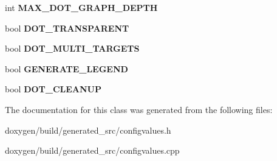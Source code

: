 \begin{DoxyCompactItemize}
int {\bfseries M\+A\+X\+\_\+\+D\+O\+T\+\_\+\+G\+R\+A\+P\+H\+\_\+\+D\+E\+P\+TH}
\item 
\mbox{\label{class_config_values_a126973fc62e20cead715f2f5dd740ddc}} 
bool {\bfseries D\+O\+T\+\_\+\+T\+R\+A\+N\+S\+P\+A\+R\+E\+NT}
\item 
\mbox{\label{class_config_values_a4f99c89f69dcf8d79fda18db78bd6161}} 
bool {\bfseries D\+O\+T\+\_\+\+M\+U\+L\+T\+I\+\_\+\+T\+A\+R\+G\+E\+TS}
\item 
\mbox{\label{class_config_values_adef6170a7e1f01c16b4ad3943745b30a}} 
bool {\bfseries G\+E\+N\+E\+R\+A\+T\+E\+\_\+\+L\+E\+G\+E\+ND}
\item 
\mbox{\label{class_config_values_af2ed9c5ea611b67f6b4ee215193396e5}} 
bool {\bfseries D\+O\+T\+\_\+\+C\+L\+E\+A\+N\+UP}
\end{DoxyCompactItemize}


The documentation for this class was generated from the following files\+:\begin{DoxyCompactItemize}
\item 
doxygen/build/generated\+\_\+src/configvalues.\+h\item 
doxygen/build/generated\+\_\+src/configvalues.\+cpp\end{DoxyCompactItemize}
